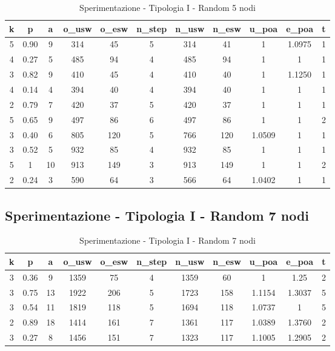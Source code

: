\begin{table}[H]
\centering
\scalebox{0.9} {
\begin{tabular}{|c|c|c|c|c|c|c|c|c|c|c|}
\hline
\textbf{k} & \textbf{p} & \textbf{a} & \textbf{o\_usw} & \textbf{o\_esw} & \textbf{n\_step} & \textbf{n\_usw} & \textbf{n\_esw} & \textbf{u\_poa} & \textbf{e\_poa} & \textbf{t} \\ \hline
5 & 0.90 & 9 & 314 & 45 & 5 & 314 & 41 & 1 & 1.0975 & 1 \\ \hline
4 & 0.27 & 5 & 485 & 94 & 4 & 485 & 94 & 1 & 1 & 1 \\ \hline
3 & 0.82 & 9 & 410 & 45 & 4 & 410 & 40 & 1 & 1.1250 & 1 \\ \hline
4 & 0.14 & 4 & 394 & 40 & 4 & 394 & 40 & 1 & 1 & 1 \\ \hline
2 & 0.79 & 7 & 420 & 37 & 5 & 420 & 37 & 1 & 1 & 1 \\ \hline
5 & 0.65 & 9 & 497 & 86 & 6 & 497 & 86 & 1 & 1 & 2 \\ \hline
3 & 0.40 & 6 & 805 & 120 & 5 & 766 & 120 & 1.0509 & 1 & 1 \\ \hline
3 & 0.52 & 5 & 932 & 85 & 4 & 932 & 85 & 1 & 1 & 1 \\ \hline
5 & 1 & 10 & 913 & 149 & 3 & 913 & 149 & 1 & 1 & 2 \\ \hline
2 & 0.24 & 3 & 590 & 64 & 3 & 566 & 64 & 1.0402 & 1 & 1 \\ \hline
\end{tabular}
}
\caption{Sperimentazione - Tipologia I - Random 5 nodi}
\label{tab:sperimentazione-tipo1-5nodi}
\end{table}


\subsection{Sperimentazione - Tipologia I - Random 7 nodi}

\begin{table}[H]
\centering
\scalebox{0.9} {
\begin{tabular}{|c|c|c|c|c|c|c|c|c|c|c|}
\hline
\textbf{k} & \textbf{p} & \textbf{a} & \textbf{o\_usw} & \textbf{o\_esw} & \textbf{n\_step} & \textbf{n\_usw} & \textbf{n\_esw} & \textbf{u\_poa} & \textbf{e\_poa} & \textbf{t} \\ \hline
3 & 0.36 & 9 & 1359 & 75 & 4 & 1359 & 60 & 1 & 1.25 & 2 \\ \hline
3 & 0.75 & 13 & 1922 & 206 & 5 & 1723 & 158 & 1.1154 & 1.3037 & 5 \\ \hline
3 & 0.54 & 11 & 1819 & 118 & 5 & 1694 & 118 & 1.0737 & 1 & 5 \\ \hline
2 & 0.89 & 18 & 1414 & 161 & 7 & 1361 & 117 & 1.0389 & 1.3760 & 2 \\ \hline
3 & 0.27 & 8 & 1456 & 151 & 7 & 1323 & 117 & 1.1005 & 1.2905 & 2 \\ \hline
\end{tabular}
}
\caption{Sperimentazione - Tipologia I - Random 7 nodi}
\label{tab:sperimentazione-tipo1-7nodi}
\end{table}


